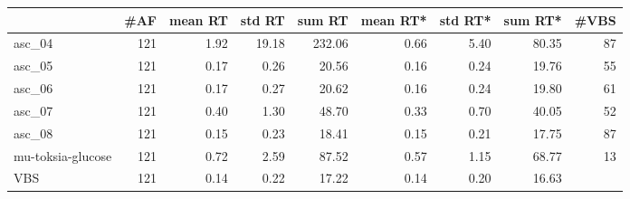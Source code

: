 \begin{tabular}{lrrrrrrrr}
\toprule
 & #AF & mean RT & std RT & sum RT & mean RT* & std RT* & sum RT* & #VBS \\
\midrule
asc_04 & 121 & 1.92 & 19.18 & 232.06 & 0.66 & 5.40 & 80.35 & 87 \\
asc_05 & 121 & 0.17 & 0.26 & 20.56 & 0.16 & 0.24 & 19.76 & 55 \\
asc_06 & 121 & 0.17 & 0.27 & 20.62 & 0.16 & 0.24 & 19.80 & 61 \\
asc_07 & 121 & 0.40 & 1.30 & 48.70 & 0.33 & 0.70 & 40.05 & 52 \\
asc_08 & 121 & 0.15 & 0.23 & 18.41 & 0.15 & 0.21 & 17.75 & 87 \\
mu-toksia-glucose & 121 & 0.72 & 2.59 & 87.52 & 0.57 & 1.15 & 68.77 & 13 \\
VBS & 121 & 0.14 & 0.22 & 17.22 & 0.14 & 0.20 & 16.63 &  \\
\bottomrule
\end{tabular}
